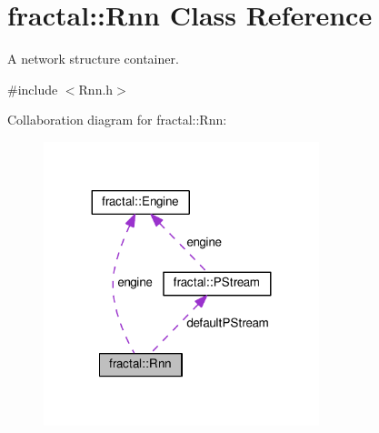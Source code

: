 \hypertarget{classfractal_1_1Rnn}{\section{fractal\+:\+:Rnn Class Reference}
\label{classfractal_1_1Rnn}
}


A network structure container.  




{\ttfamily \#include $<$Rnn.\+h$>$}



Collaboration diagram for fractal\+:\+:Rnn\+:\nopagebreak
\begin{figure}[H]
\begin{center}
\leavevmode
\includegraphics[width=227pt]{d8/dc5/classfractal_1_1Rnn__coll__graph}
\end{center}
\end{figure}
